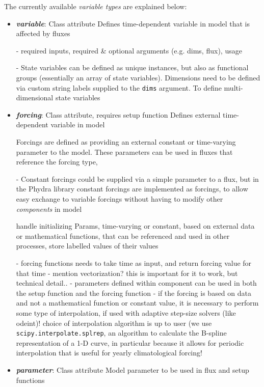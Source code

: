\documentclass[journal abbreviation, manuscript]{copernicus}
\begin{document}
The currently available \textit{variable types} are explained below:
\begin{itemize}
    \item \textbf{\textit{variable}}: Class attribute
    Defines time-dependent variable in model that is affected by fluxes
    
    - required inputs, required \& optional arguments (e.g. dims, flux), usage

    - State variables can be defined as unique instances, but also as functional groups (essentially an array of state variables). Dimensions need to be defined via custom string labels supplied to the \texttt{dims} argument. To define multi-dimensional state variables
    
    \item \textbf{\textit{forcing}}: Class attribute, requires setup function
    Defines external time-dependent variable in model
    
    Forcings are defined as providing an external constant or time-varying parameter to the model. These parameters can be used in fluxes that reference the forcing type,
    
    - Constant forcings could be supplied via a simple parameter to a flux, but in the Phydra library constant forcings are implemented as forcings, to allow easy exchange to variable forcings without having to modify other \textit{components} in model 

    handle initializing Params, time-varying or constant, based on external data or mathematical functions, that can be referenced and used in other processes, store labelled values of their values

    - forcing functions needs to take time as input, and return forcing value for that time
    - mention vectorization? this is important for it to work, but technical detail..
    - parameters defined within component can be used in both the setup function and the forcing function
    - if the forcing is based on data and not a mathematical function or constant value, it is necessary to perform some type of interpolation, if used with adaptive step-size solvers (like odeint)! choice of interpolation algorithm is up to user (we use \texttt{scipy.interpolate.splrep}, an algorithm to calculate the B-spline representation of a 1-D curve, in particular because it allows for periodic interpolation that is useful for yearly climatological forcing!
    
    \item \textbf{\textit{parameter}}: Class attribute
    Model parameter to be used in flux and setup functions
    

\end{itemize}
\end{document}

